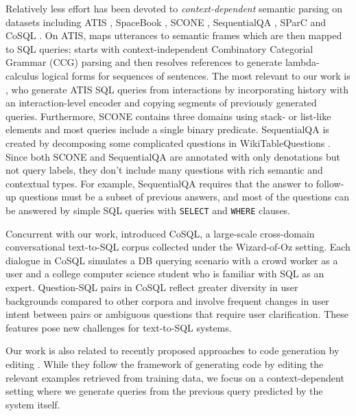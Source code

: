 \documentclass[11pt,a4paper]{article}
\begin{document}
Relatively less effort has been devoted to \textit{context-dependent} semantic parsing on datasets including ATIS \cite{hemphill1990atis,dahl1994expanding}, SpaceBook \cite{vlachos2014new}, SCONE \cite{long2016simpler,guu2017language,fried2018unified,suhr2018situated,huang2019flowqa}, SequentialQA \cite{iyyer2017search}, SParC \cite{yu2019sparc} and CoSQL \cite{yu2019cosql}.
On ATIS,  maps utterances to semantic frames which are then mapped to SQL queries;  starts with context-independent Combinatory Categorial Grammar (CCG) parsing and then resolves references to generate lambda-calculus logical forms for sequences of sentences.
The most relevant to our work is , who generate ATIS SQL queries from interactions by incorporating history with an interaction-level encoder and copying segments of previously generated queries.
Furthermore, SCONE contains three domains using stack- or list-like elements and most queries include a single binary predicate.
SequentialQA is created by decomposing some complicated questions in WikiTableQuestions \cite{pasupat2015compositional}.
Since both SCONE and SequentialQA are annotated with only denotations but not query labels, they don't include many questions with rich semantic and contextual types.
For example, SequentialQA \cite{iyyer2017search} requires that the answer to follow-up questions must be a subset of previous answers, and most of the questions can be answered by simple SQL queries with \texttt{SELECT} and \texttt{WHERE} clauses.

Concurrent with our work,  introduced CoSQL, a large-scale cross-domain conversational text-to-SQL corpus collected under the  Wizard-of-Oz setting. Each dialogue in CoSQL simulates a DB querying scenario with a crowd worker as a user and a college computer science student who is familiar with SQL as an expert. Question-SQL pairs in CoSQL reflect greater diversity in user backgrounds compared to other corpora and involve frequent changes in user intent between pairs or ambiguous questions that require user clarification. These features pose new challenges for text-to-SQL systems.

Our work is also related to recently proposed approaches to code generation by editing \cite{hayati2018retrieval,yin2019learning,hashimoto2018retrieve}.
While they follow the framework of generating code by editing the relevant examples retrieved from training data, we focus on a context-dependent setting where we generate queries from the previous query predicted by the system itself.
\end{document}
